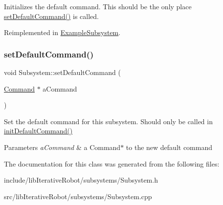 Initializes the default command. This should be the only place \mbox{\hyperlink{classlib_iterative_robot_1_1_subsystem_a6fff5c5756245ac750c2b26ee0ed2be7}{set\+Default\+Command()}} is called. 

Reimplemented in \mbox{\hyperlink{class_example_subsystem_a147ea127ab9c71f9d86e4f5e5a4e9d5a}{Example\+Subsystem}}.

\mbox{\label{classlib_iterative_robot_1_1_subsystem_a6fff5c5756245ac750c2b26ee0ed2be7}} 
\subsubsection{\texorpdfstring{setDefaultCommand()}{setDefaultCommand()}}
{\footnotesize\ttfamily void Subsystem\+::set\+Default\+Command (\begin{DoxyParamCaption}\item[{\mbox{\hyperlink{classlib_iterative_robot_1_1_command}{Command}} $\ast$}]{a\+Command }\end{DoxyParamCaption})\hspace{0.3cm}{\ttfamily [protected]}}

Set the default command for this subsystem. Should only be called in \mbox{\hyperlink{classlib_iterative_robot_1_1_subsystem_a30bd6c33c84c896f31ed01c8331aab57}{init\+Default\+Command()}}


\begin{DoxyParams}{Parameters}
{\em a\+Command} & a Command$\ast$ to the new default command \\
\hline
\end{DoxyParams}


The documentation for this class was generated from the following files\+:\begin{DoxyCompactItemize}
\item 
include/lib\+Iterative\+Robot/subsystems/Subsystem.\+h\item 
src/lib\+Iterative\+Robot/subsystems/Subsystem.\+cpp\end{DoxyCompactItemize}
